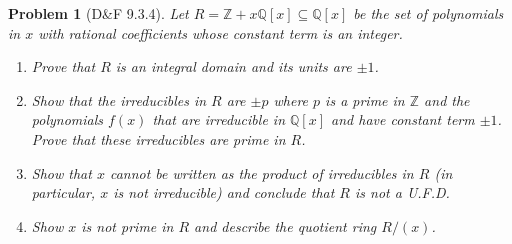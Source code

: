 \documentclass{article}
\newtheorem{plm}{Problem}
\begin{document}
\begin{plm}[D\&F 9.3.4]
  Let $R = \mathbb{Z} + x\mathbb{Q}[x] \subseteq \mathbb{Q}[x]$ be the set of polynomials in $x$ with rational coefficients
  whose constant term is an integer.
  \begin{enumerate}
  \item Prove that $R$ is an integral domain and its units are $\pm 1$.
  \item Show that the irreducibles in $R$ are $\pm p$ where $p$ is a prime in $\mathbb{Z}$ and the polynomials $f(x)$
    that are irreducible in $\mathbb{Q}[x]$ and have constant term $\pm 1$.
    Prove that these irreducibles are prime in $R$.
  \item Show that $x$ cannot be written as the product of irreducibles in $R$ (in particular, $x$ is not irreducible)
    and conclude that $R$ is not a U.F.D.
  \item Show $x$ is not prime in $R$ and describe the quotient ring $R / (x)$.
  \end{enumerate}
\end{plm}
\end{document}

